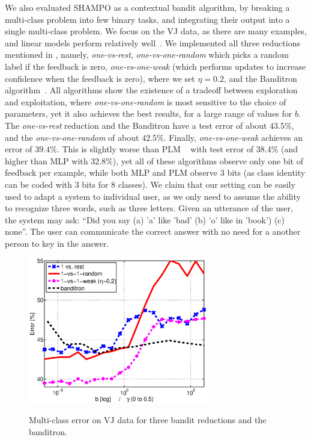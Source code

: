 We also evaluated SHAMPO as a contextual bandit algorithm, by breaking a multi-class problem into few 
binary tasks, and integrating their output into a single multi-class problem. 
We focus on the VJ data, as there are many examples, and linear models perform relatively 
well~\cite{lin2009lose}.  We implemented all three reductions
mentioned in , namely, {\em one-vs-rest}, {\em one-vs-one-random} which picks a 
random label if the feedback is zero, {\em one-vs-one-weak} (which performs updates to increase 
confidence when the feedback is zero), where we set $\eta=0.2$, and the 
Banditron algorithm~\cite{kakade2008efficient}.
All algorithms show the existence of a tradeoff between exploration and exploitation, 
where {\em one-vs-one-random} is most sensitive to the choice of parameters, yet it also achieves the best 
results, for a large range of values for $b$.
The  {\em one-vs-rest} reduction and the Banditron have a test error of about $43.5\%$, and the 
{\em one-vs-one-random} of about $42.5\%$.
Finally, {\em one-vs-one-weak} achieves an error of $39.4\%$.
 This is slightly worse than PLM
~\cite{lin2009lose} with test error of $38.4\%$ (and higher than MLP with $32.8\%$), 
yet all of these algorithms observe only one bit of feedback per example, while both MLP and PLM 
observe $3$ bits (as class identity can be coded with $3$ bits for $8$ classes). We claim that our setting 
can be easily used to adapt a system to individual user, as we only need to assume the ability to recognize 
three words, such as three letters. Given an utterance of the user, the system may ask: 
``Did you say (a) 'a' like 'bad' (b) 'o' like in 'book') (c) none''. The user can communicate the correct answer 
with no need for a another person to key in the answer.

\begin{figure}[!ht]
\begin{centering}
\includegraphics[width=0.7\textwidth]{figs/VJ_three_methods.eps}\label{fig:mc_vj}
\caption{Multi-class error on VJ data for three bandit reductions and the banditron.}
\end{centering}
\end{figure}

